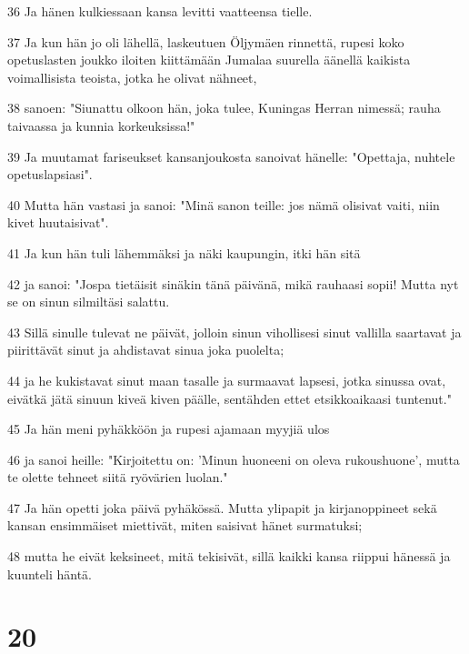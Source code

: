 \par 36 Ja hänen kulkiessaan kansa levitti vaatteensa tielle.
\par 37 Ja kun hän jo oli lähellä, laskeutuen Öljymäen rinnettä, rupesi koko opetuslasten joukko iloiten kiittämään Jumalaa suurella äänellä kaikista voimallisista teoista, jotka he olivat nähneet,
\par 38 sanoen: "Siunattu olkoon hän, joka tulee, Kuningas Herran nimessä; rauha taivaassa ja kunnia korkeuksissa!"
\par 39 Ja muutamat fariseukset kansanjoukosta sanoivat hänelle: "Opettaja, nuhtele opetuslapsiasi".
\par 40 Mutta hän vastasi ja sanoi: "Minä sanon teille: jos nämä olisivat vaiti, niin kivet huutaisivat".
\par 41 Ja kun hän tuli lähemmäksi ja näki kaupungin, itki hän sitä
\par 42 ja sanoi: "Jospa tietäisit sinäkin tänä päivänä, mikä rauhaasi sopii! Mutta nyt se on sinun silmiltäsi salattu.
\par 43 Sillä sinulle tulevat ne päivät, jolloin sinun vihollisesi sinut vallilla saartavat ja piirittävät sinut ja ahdistavat sinua joka puolelta;
\par 44 ja he kukistavat sinut maan tasalle ja surmaavat lapsesi, jotka sinussa ovat, eivätkä jätä sinuun kiveä kiven päälle, sentähden ettet etsikkoaikaasi tuntenut."
\par 45 Ja hän meni pyhäkköön ja rupesi ajamaan myyjiä ulos
\par 46 ja sanoi heille: "Kirjoitettu on: 'Minun huoneeni on oleva rukoushuone', mutta te olette tehneet siitä ryövärien luolan."
\par 47 Ja hän opetti joka päivä pyhäkössä. Mutta ylipapit ja kirjanoppineet sekä kansan ensimmäiset miettivät, miten saisivat hänet surmatuksi;
\par 48 mutta he eivät keksineet, mitä tekisivät, sillä kaikki kansa riippui hänessä ja kuunteli häntä.

\chapter{20}

